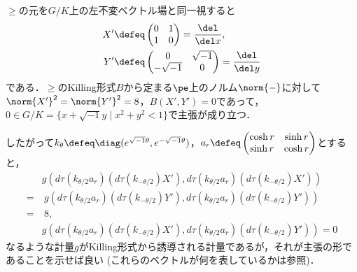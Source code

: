 \begin{npfwn}
  
  $\ge$の元を$G/K$上の左不変ベクトル場と同一視すると
  \begin{align*}
    X' &\defeq 
         \begin{pmatrix}
           0 & 1 \\ 1 & 0
         \end{pmatrix} = \dfrac{\del}{\del x},\\
    Y' &\defeq 
         \begin{pmatrix}
           0 & \sqrt{-1} \\ -\sqrt{-1} & 0
         \end{pmatrix} = \dfrac{\del}{\del y}
  \end{align*}
  である．$\ge$のKilling形式$B$から定まる$\pe$上のノルム$\norm{-} $に対して$\norm{X'}^2 = \norm{Y'}^2 = 8 $，$B(X', Y' ) = 0$であって，$0\in G/K =\{x+\sqrt{-1}y\mid x^2 + y^2 < 1 \}  $で主張が成り立つ．

  したがって$k_{\theta} \defeq \diag(e^{\sqrt{-1}\theta},e^{-\sqrt{-1}\theta}) $，$a_r\defeq
  \begin{pmatrix}
    \cosh r & \sinh r \\  \sinh r & \cosh r
  \end{pmatrix}
  $とすると，
  \begin{align*}
    &g(d\tau(k_{\theta/2}a_r)(d\tau(k_{-\theta/2})X'), d\tau(k_{\theta/2}a_r)(d\tau(k_{-\theta/2})X')) \\
    =&\ g (d\tau(k_{\theta/2}a_r)(d\tau(k_{-\theta/2})Y'), d\tau(k_{\theta/2}a_r)(d\tau(k_{-\theta/2})Y')) \\
    =&\ 8, \\
    &g(d\tau(k_{\theta/2}a_r)(d\tau(k_{-\theta/2})X'), d\tau(k_{\theta/2}a_r)(d\tau(k_{-\theta/2})Y'))  = 0
  \end{align*}
  なるような計量$g $がKilling形式から誘導される計量であるが，それが主張の形であることを示せば良い (これらのベクトルが何を表しているかは参照)．


\end{npfwn}
